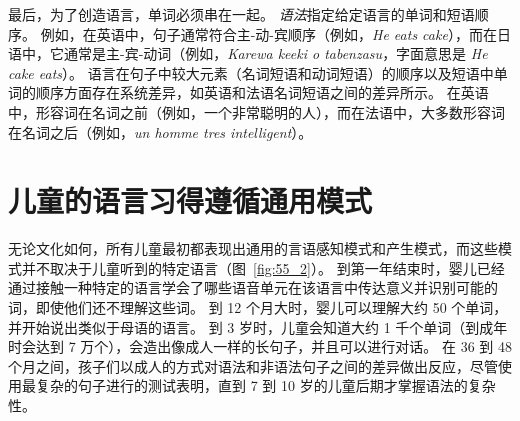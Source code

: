 最后，为了创造语言，单词必须串在一起。
\textit{语法}指定给定语言的单词和短语顺序。
例如，在英语中，句子通常符合主-动-宾顺序（例如，\textit{He eats cake}），而在日语中，它通常是主-宾-动词（例如，\textit{Karewa keeki o tabenzasu}，字面意思是 \textit{He cake eats}）。
语言在句子中较大元素（名词短语和动词短语）的顺序以及短语中单词的顺序方面存在系统差异，如英语和法语名词短语之间的差异所示。
在英语中，形容词在名词之前（例如，一个非常聪明的人），而在法语中，大多数形容词在名词之后（例如，\textit{un homme tres intelligent}）。



\section{儿童的语言习得遵循通用模式}

无论文化如何，所有儿童最初都表现出通用的言语感知模式和产生模式，而这些模式并不取决于儿童听到的特定语言（图~\ref{fig:55_2}）。
到第一年结束时，婴儿已经通过接触一种特定的语言学会了哪些语音单元在该语言中传达意义并识别可能的词，即使他们还不理解这些词。
到 12 个月大时，婴儿可以理解大约 50 个单词，并开始说出类似于母语的语言。
到 3 岁时，儿童会知道大约 1 千个单词（到成年时会达到 7 万个），会造出像成人一样的长句子，并且可以进行对话。
在 36 到 48 个月之间，孩子们以成人的方式对语法和非语法句子之间的差异做出反应，尽管使用最复杂的句子进行的测试表明，直到 7 到 10 岁的儿童后期才掌握语法的复杂性。


